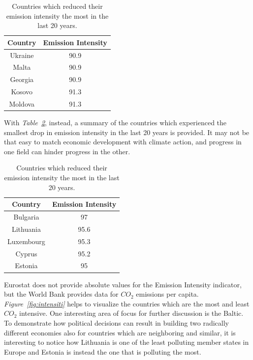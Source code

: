 \documentclass[a4paper,12pt]{book}
\begin{document}
\begin{table}[tb]
\begin{center}
\begin{tabular}{|c|c|}
\hline
Country & Emission Intensity \\
\hline
Ukraine & 90.9\\
Malta & 90.9\\
Georgia & 90.9\\
Kosovo & 91.3\\
Moldova & 91.3\\
\hline
\end{tabular}
\caption{Countries which reduced their emission intensity the most in the last 20 years.}
\label{Tab:ems}
\end{center}
\end{table}

With \textit{Table~\ref{Tab:emiss}}, instead, a summary of the countries which experienced the smallest drop in emission intensity in the last 20 years is provided. It may not be that easy to match economic development with climate action, and progress in one field can hinder progress in the other.

\begin{table}[tb]
\begin{center}
\begin{tabular}{|c|c|}
\hline
Country & Emission Intensity \\
\hline
Bulgaria & 97\\
Lithuania & 95.6\\
Luxembourg & 95.3\\
Cyprus & 95.2\\
Estonia & 95\\
\hline
\end{tabular}
\caption{Countries which reduced their emission intensity the most in the last 20 years.}
\label{Tab:emiss}
\end{center}
\end{table}

Eurostat does not provide absolute values for the Emission Intensity indicator, but the World Bank provides data for $CO_{2}$ emissions per capita. \textit{Figure~\ref{fig:intensiti}} helps to visualize the countries which are the most and least $CO_{2}$ intensive. One interesting area of focus for further discussion is the Baltic. To demonstrate how political decisions can result in building two radically different economies also for countries which are neighboring and similar, it is interesting to notice how Lithuania is one of the least polluting member states in Europe and Estonia is instead the one that is polluting the most.
\end{document}

